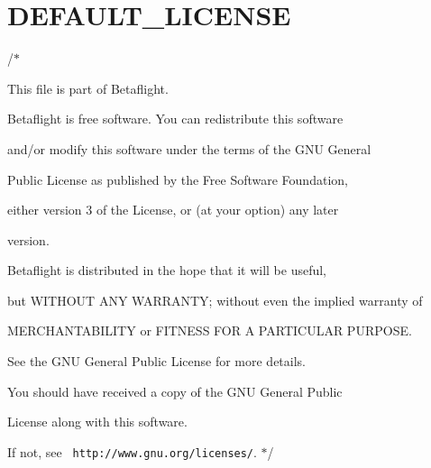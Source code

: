 \chapter{DEFAULT\+\_\+\+LICENSE}
\label{md__c_1_2_hier_2_m_a___drohne_2_drohne___project_2betaflight_2_d_e_f_a_u_l_t___l_i_c_e_n_s_e}
/$\ast$
\begin{DoxyItemize}
\item This file is part of Betaflight.
\item 
\item Betaflight is free software. You can redistribute this software
\item and/or modify this software under the terms of the GNU General
\item Public License as published by the Free Software Foundation,
\item either version 3 of the License, or (at your option) any later
\item version.
\item 
\item Betaflight is distributed in the hope that it will be useful,
\item but WITHOUT ANY WARRANTY; without even the implied warranty of
\item MERCHANTABILITY or FITNESS FOR A PARTICULAR PURPOSE.
\item 
\item See the GNU General Public License for more details.
\item 
\item You should have received a copy of the GNU General Public
\item License along with this software.
\item 
\item If not, see {\texttt{ http\+://www.\+gnu.\+org/licenses/}}. $\ast$/ 
\end{DoxyItemize}